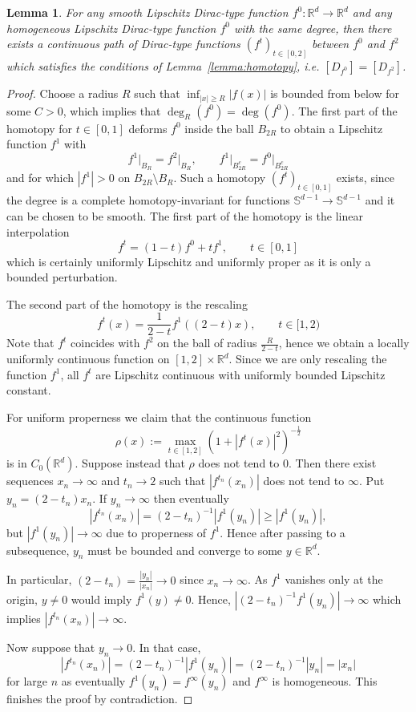 \documentclass[12pt]{amsart}
\newtheorem{lemma}[theorem]{Lemma}
\newcommand{\RM}{{\mathbb R}}
\newcommand{\SM}{{\mathbb S}}
\providecommand{\abs}[1]{\left \lvert#1 \right \rvert}
\begin{document}
\begin{lemma}
\label{lem:homogeneous}
For any smooth Lipschitz Dirac-type function $f^0:\RM^d \to \RM^d$ and any homogeneous Lipschitz Dirac-type function $f^0$ with the same degree, then there exists a continuous path of Dirac-type functions $(f^{t})_{t\in [0,2]}$ between $f^0$ and $f^2$ which satisfies the conditions of Lemma~\ref{lemma:homotopy}, i.e. $[D_{f^0}]=[D_{f^2}]$.
\end{lemma}
\begin{proof}
Choose a radius $R$ such that $\inf_{|x| \geq R} |f(x)|$ is bounded from below for some $C>0$, which implies that $\deg_R(f^0)=\deg(f^0)$. The first part of the homotopy for $t\in [0,1]$ deforms $f^0$ inside the ball $B_{2R}$ to obtain a Lipschitz function $f^1$ with $$f^1\rvert_{B_R}=f^2 \rvert_{B_R}, \qquad f^1\rvert_{B_{2R}^c}=f^0\rvert_{B_{2R}^c}$$
and for which $\abs{f^1} > 0$ on $B_{2R} \setminus B_R$. 
Such a homotopy $(f^{t})_{t\in [0,1]}$ exists, since the degree is a complete homotopy-invariant for functions $\SM^{d-1}\to \SM^{d-1}$  and it can be chosen to be smooth.
The first part of the homotopy is the linear interpolation
$$f^t= (1-t) f^0 + t f^1, \qquad t\in [0,1]$$ which is certainly uniformly Lipschitz and uniformly proper as it is only a bounded perturbation.

The second part of the homotopy is the rescaling
$$f^t(x) = \frac{1}{2-t} f^1\left((2-t)x\right), \qquad t\in [1,2)$$
Note that $f^t$ coincides with $f^2$ on the ball of radius $\frac{R}{2-t}$, hence we obtain a locally uniformly continuous function on $[1,2]\times \RM^d$. Since we are only rescaling the function $f^1$, all $f^t$ are Lipschitz continuous with uniformly bounded Lipschitz constant. 

For uniform properness we claim that the continuous function
$$\rho(x) := \max_{t\in [1,2]} (1+|f^t(x)|^2)^{-\frac12}$$
is in $C_0(\RM^d)$. 
Suppose instead that $\rho$ does not tend to $0$. 
Then there exist sequences $x_n\to \infty$ and $t_n \to 2$ such that $|f^{t_n}(x_n)|$ does not tend to $\infty$. Put $y_n= (2-t_n)x_n$. If $y_n\to \infty$ then eventually 
\[|f^{t_n}(x_n)|=(2-t_n)^{-1} |f^1(y_n)|\geq |f^1(y_n)|,\]
but $|f^1(y_n)| \to \infty$ due to properness of $f^1$. Hence after passing to a subsequence, $y_n$ must be bounded and converge to some $y\in \RM^d$.

In particular, $(2-t_n)=\frac{|y_n|}{|x_n|}\to 0$ since $x_n\to \infty$. As $f^1$ vanishes only at the origin, $y\neq 0$ would imply $f^1(y)\neq 0$.
Hence, $|(2-t_n)^{-1}f^1(y_n)| \to \infty$ which implies $|f^{t_n}(x_n)|\to \infty$. 

Now suppose that $y_n\to 0$. In that case, $$|f^{t_n}(x_n)|=(2-t_n)^{-1}|f^1(y_n)|= (2-t_n)^{-1}|y_n| = |x_n|$$ for large $n$ as eventually $f^1(y_n)=f^\infty(y_n)$ and $f^\infty$ is homogeneous. This finishes the proof by contradiction.
\end{proof}
\end{document}
